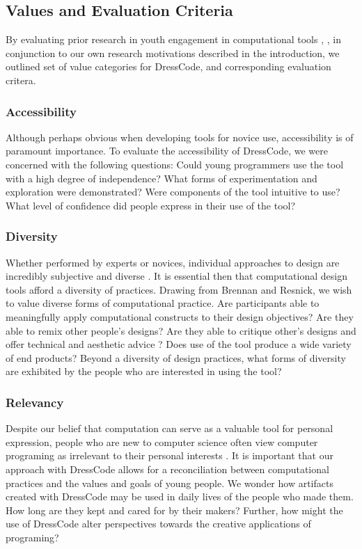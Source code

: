 \documentclass{sigchi}
\begin{document}
\subsection{Values and Evaluation Criteria}
By evaluating prior research in youth engagement in computational tools \cite{computational_thinking}, \cite{introductory_programing}, in conjunction to our own research motivations described in the introduction, we outlined set of value categories for DressCode, and corresponding evaluation critera.

\subsubsection{Accessibility}
 Although perhaps obvious when developing tools for novice use, accessibility is of paramount importance. To evaluate the accessibility of DressCode, we were concerned with the following questions: Could young programmers use the tool with a high degree of independence? What forms of experimentation and exploration were demonstrated? Were components of the tool intuitive to use? What level of confidence did people express in their use of the tool?

\subsubsection{Diversity}
 Whether performed by experts or novices, individual approaches to design are incredibly subjective and diverse \cite{learning_in_design}. It is essential then that computational design tools afford a diversity of practices. Drawing from Brennan and Resnick, we wish to value diverse forms of computational practice. Are participants able to meaningfully apply computational constructs to their design objectives? Are they able to remix other people's designs? Are they able to critique other's designs and offer technical and aesthetic advice \cite{computational_thinkng}? Does use of the tool produce a wide variety of end products? Beyond a diversity of design practices, what forms of diversity are exhibited by the people who are interested in using the tool? %

\subsubsection{Relevancy}
  Despite our belief that computation can serve as a valuable tool for personal expression, people who are new to computer science often view computer programing as irrelevant to their personal interests \cite{introductory_programming}. It is important that our approach with DressCode allows for a reconciliation between computational practices and the values and goals of young people. We wonder how  artifacts created with DressCode may be used in daily lives of the people who made them. How long are they kept and cared for by their makers? Further, how might the use of DressCode alter perspectives towards the creative applications of programing?
\end{document}
